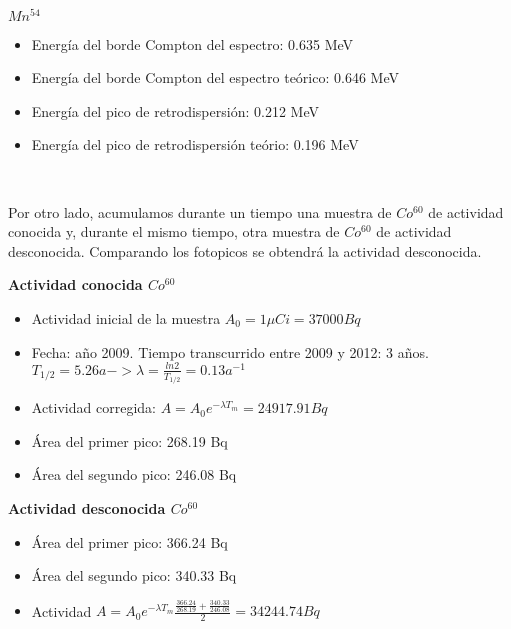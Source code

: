 \documentclass[11pt]{article}
\begin{document}
    \begin{center}
    \end{center}
    { \hspace*{\fill} \\}
    
    \(Mn^{54}\)

\begin{itemize}
\item
  Energía del borde Compton del espectro: 0.635 MeV
\item
  Energía del borde Compton del espectro teórico: 0.646 MeV
\item
  Energía del pico de retrodispersión: 0.212 MeV
\item
  Energía del pico de retrodispersión teório: 0.196 MeV
\end{itemize}

    \begin{center}
    \end{center}
    { \hspace*{\fill} \\}
    
    Por otro lado, acumulamos durante un tiempo una muestra de \(Co^{60}\)
de actividad conocida y, durante el mismo tiempo, otra muestra de
\(Co^{60}\) de actividad desconocida. Comparando los fotopicos se
obtendrá la actividad desconocida.

    \textbf{Actividad conocida \(Co^{60}\)}

\begin{itemize}
\item
  Actividad inicial de la muestra \(A_0 = 1 \mu Ci = 37000 Bq\)
\item
  Fecha: año 2009. Tiempo transcurrido entre 2009 y 2012: 3 años.
  \(T_{1/2} = 5.26 a -> \lambda = \frac{ln2}{T_{1/2}} = 0.13 a^{-1}\)
\item
  Actividad corregida: \(A = A_0e^{- \lambda T_m} = 24917.91 Bq\)
\item
  Área del primer pico: 268.19 Bq
\item
  Área del segundo pico: 246.08 Bq
\end{itemize}

\textbf{Actividad desconocida \(Co^{60}\)}

\begin{itemize}
\item
  Área del primer pico: 366.24 Bq
\item
  Área del segundo pico: 340.33 Bq
\item
  Actividad
  \(A = A_0e^{- \lambda T_m} \frac{\frac{366.24}{268.19} + \frac{340.33}{246.08}}{2} = 34244.74 Bq\)
\end{itemize}
\end{document}
